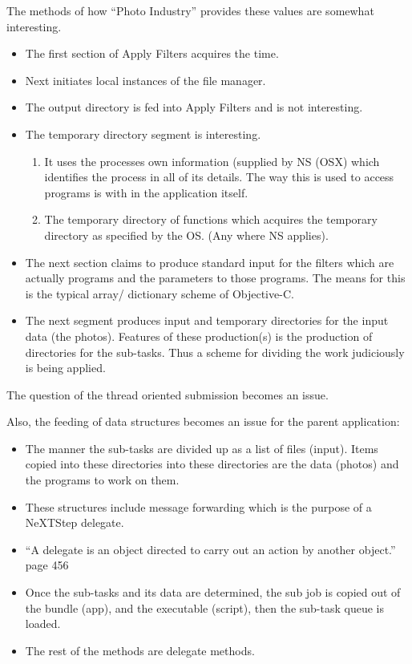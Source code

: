 \documentclass[11pt]{article}
\begin{document}
The methods of how ``Photo Industry'' provides these values are somewhat interesting.  
\begin{itemize}
\item The first section of Apply Filters acquires the time.   
\item Next initiates local instances of the file manager.  
\item The output directory is fed into Apply Filters and is not interesting.  
\item The temporary directory segment is interesting.  
\begin{enumerate}
\item It uses the processes own information (supplied by NS (OSX) which identifies the process in all of its details.  The way this is used to access programs is with in the application itself.  
\item The temporary directory of functions which acquires the temporary directory as specified by the OS.  (Any where NS applies). 
\end{enumerate}
\item The next section claims to produce standard input for the filters which are actually programs and the parameters to those programs.  The means for this is the typical array/ dictionary scheme of Objective-C.  
\item The next segment produces input and temporary directories for the input data (the photos).  Features of these production(s) is the production of directories for the sub-tasks.  Thus a scheme for dividing the work judiciously is being applied.  
\end{itemize}
The question of the thread oriented submission becomes an issue.

Also, the feeding of data structures becomes an issue for the parent application:
\begin{itemize}
\item The manner the sub-tasks are divided up as a list of files (input).   Items copied into these directories into these directories are the data (photos) and the programs to work on them.
\item These structures include message forwarding which is the purpose of a NeXTStep delegate.  
\item ``A delegate is an object directed to carry out an action by another object.'' page 456 \cite {Kochan}
\item Once the sub-tasks and its data are determined, the sub job is copied out of the bundle (app), and the executable (script), then the sub-task queue is loaded.  
\item The rest of the methods are delegate methods.

\end{itemize}
\end{document}
